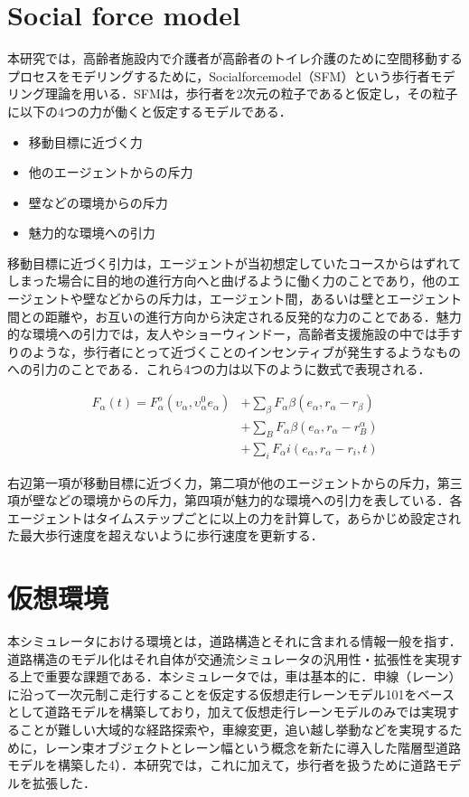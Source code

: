 \section{Social force model}

本研究では，高齢者施設内で介護者が高齢者のトイレ介護のために空間移動するプロセスをモデリングするために，Socialforcemodel（SFM）\cite{SFM}という歩行者モデリング理論を用いる．SFMは，歩行者を2次元の粒子であると仮定し，その粒子に以下の4つの力が働くと仮定するモデルである．

\begin{itemize}
 \item 移動目標に近づく力
 \item 他のエージェントからの斥力
 \item 壁などの環境からの斥力
 \item 魅力的な環境への引力
\end{itemize}

移動目標に近づく引力は，エージェントが当初想定していたコースからはずれてしまった場合に目的地の進行方向へと曲げるように働く力のことであり，他のエージェントや壁などからの斥力は，エージェント間，あるいは壁とエージェント間との距離や，お互いの進行方向から決定される反発的な力のことである．魅力的な環境への引力では，友人やショーウィンドー，高齢者支援施設の中では手すりのような，歩行者にとって近づくことのインセンティブが発生するようなものへの引力のことである．これら4つの力は以下のように数式で表現される．

\begin{equation}
\begin{split}
 F_α(t)=F_α^o(υ_α,υ_α^0e_α)&+\sum_{β}F_αβ(e_α,r_α-r_β)\\
 &+\sum_{B}F_αβ(e_α,r_α-r_B^α)\\
 &+\sum_{i}F_αi(e_α,r_α-r_i,t)
\end{split}
\end{equation}

右辺第一項が移動目標に近づく力，第二項が他のエージェントからの斥力，第三項が壁などの環境からの斥力，第四項が魅力的な環境への引力を表している．各エージェントはタイムステップごとに以上の力を計算して，あらかじめ設定された最大歩行速度を超えないように歩行速度を更新する．

\section{仮想環境}
本シミュレータにおける環境とは，道路構造とそれに含まれる情報一般を指す．道路構造のモデル化はそれ自体が交通流シミュレータの汎用性・拡張性を実現する上で重要な課題である．本シミュレータでは，車は基本的に．申線（レーン）に沿って一次元制こ走行することを仮定する仮想走行レーンモデル101をベースとして道路モデルを構築しており，加えて仮想走行レーンモデルのみでは実現することが難しい大域的な経路探索や，車線変更，追い越し挙動などを実現するために，レーン束オブジェクトとレーン幅という概念を新たに導入した階層型道路モデルを構築した4）．本研究では，これに加えて，歩行者を扱うために道路モデルを拡張した．

